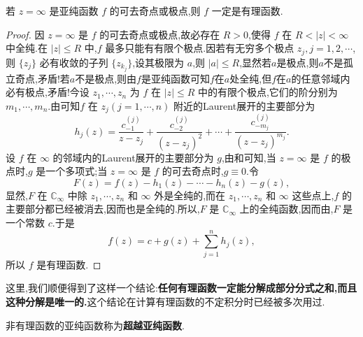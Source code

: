 \documentclass[../../main.tex]{subfiles}%
\begin{document}
\begin{theorem}\label{theorem:定理5.3.3}
若 \( z = \infty \) 是亚纯函数 \( f \) 的可去奇点或极点,则 \( f \) 一定是有理函数.
\end{theorem}
\begin{proof}

因 \( z = \infty \) 是 \( f \) 的可去奇点或极点,故必存在 \( R > 0 \),使得 \( f \) 在 \( R < |z| < \infty \) 中全纯.在 \( |z| \leqslant R \) 中,\( f \) 最多只能有有限个极点.因若有无穷多个极点 \( z_j, j = 1, 2, \cdots \),则 \( \{ z_j \} \) 必有收敛的子列 \( \{ z_{k_j} \} \),设其极限为 \( a \),则 \( |a| \leqslant R \),显然若$a$是极点,则\( a \)不是孤立奇点,矛盾!若$a$不是极点,则由$f$是亚纯函数可知$f$在$a$处全纯,但$f$在$a$的任意邻域内必有极点,矛盾!今设 \( z_1, \cdots, z_n \) 为 \( f \) 在 \( |z| \leqslant R \) 中的有限个极点,它们的阶分别为 \( m_1, \cdots, m_n \).由可知\( f \) 在 \( z_j (j = 1, \cdots, n) \) 附近的Laurent展开的主要部分为
\[
h_j(z) = \frac{c_{-1}^{(j)}}{z - z_j} + \frac{c_{-2}^{(j)}}{(z - z_j)^2} + \cdots + \frac{c_{-m_j}^{(j)}}{(z - z_j)^{m_j}}.
\]
设 \( f \) 在 \( \infty \) 的邻域内的Laurent展开的主要部分为 \( g \),由和可知,当 \( z = \infty \) 是 \( f \) 的极点时,\( g \) 是一个多项式;当 \( z = \infty \) 是 \( f \) 的可去奇点时,\( g \equiv 0 \).令
\[
F(z) = f(z) - h_1(z) - \cdots - h_n(z) - g(z),
\]
显然,\( F \) 在 \( \mathbb{C}_{\infty} \) 中除 \( z_1, \cdots, z_n \) 和 \( \infty \) 外是全纯的,而在 \( z_1, \cdots, z_n \) 和 \( \infty \) 这些点上,\( f \) 的主要部分都已经被消去,因而也是全纯的.所以,\( F \) 是 \( \mathbb{C}_{\infty} \) 上的全纯函数,因而由,\( F \) 是一个常数 \( c \).于是
\[
f(z) = c + g(z) + \sum_{j = 1}^{n} h_j(z),
\]
所以 \( f \) 是有理函数.

\end{proof}
\begin{remark}
这里,我们顺便得到了这样一个结论:\textbf{任何有理函数一定能分解成部分分式之和,而且这种分解是唯一的.}这个结论在计算有理函数的不定积分时已经被多次用过.
\end{remark}

\begin{definition}
非有理函数的亚纯函数称为\textbf{超越亚纯函数}.
\end{definition}
\end{document}
